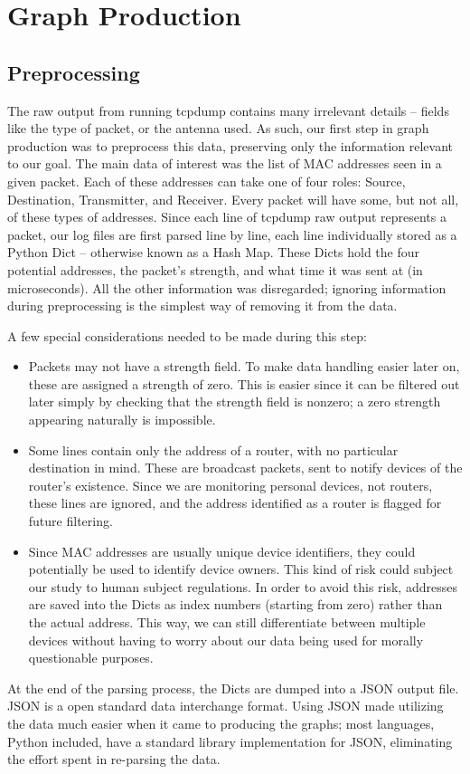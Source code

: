 \documentclass[11pt,journal,compsoc]{IEEEtran} %
\begin{document}
\section{Graph Production}

\subsection*{Preprocessing}

	The raw output from running tcpdump contains many irrelevant details -- fields like the type of packet, or the antenna used.
	As such, our first step in graph production was to preprocess this data, preserving only the information relevant to our goal.
    The main data of interest was the list of MAC addresses seen in a given packet.
    Each of these addresses can take one of four roles: Source, Destination, Transmitter, and Receiver.
    Every packet will have some, but not all, of these types of addresses.
    Since each line of tcpdump raw output represents a packet, our log files are first parsed line by line, each line individually stored as a Python Dict -- otherwise known as a Hash Map.
    These Dicts hold the four potential addresses, the packet's strength, and what time it was sent at (in microseconds).
    All the other information was disregarded; ignoring information during preprocessing is the simplest way of removing it from the data.

A few special considerations needed to be made during this step:
    \begin{itemize}
    \item Packets may not have a strength field.
      To make data handling easier later on, these are assigned a strength of zero.
      This is easier since it can be filtered out later simply by checking that the strength field is nonzero; a zero strength appearing naturally is impossible. 
    \item Some lines contain only the address of a router, with no particular destination in mind.
      These are broadcast packets, sent to notify devices of the router's existence.
      Since we are monitoring personal devices, not routers, these lines are ignored, and the address identified as a router is flagged for future filtering.
    \item Since MAC addresses are usually unique device identifiers, they could potentially be used to identify device owners.
      This kind of risk could subject our study to human subject regulations.
      In order to avoid this risk, addresses are saved into the Dicts as index numbers (starting from zero) rather than the actual address.
      This way, we can still differentiate between multiple devices without having to worry about our data being used for morally questionable purposes.
    \end{itemize}
    At the end of the parsing process, the Dicts are dumped into a JSON output file.
    JSON is a open standard data interchange format.
    Using JSON made utilizing the data much easier when it came to producing the graphs; most languages, Python included, have a standard library implementation for JSON, eliminating the effort spent in re-parsing the data. %
\end{document}

